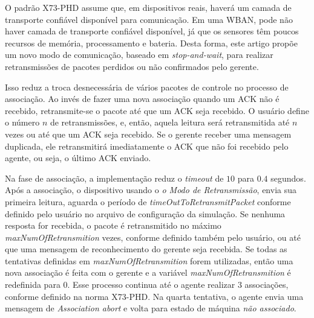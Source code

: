 O padrão X73-PHD assume que, em dispositivos reais, haverá um camada de transporte confiável disponível para comunicação. Em uma WBAN, pode não haver camada de transporte confiável disponível, já que os sensores têm poucos recursos de memória, processamento e bateria. Desta forma, este artigo propõe um novo modo de comunicação, baseado em \textit{stop-and-wait}, para realizar retransmissões de pacotes perdidos ou não confirmados pelo gerente.

Isso reduz a troca desnecessária de vários pacotes de controle no processo de associação. Ao invés de fazer uma nova associação quando um ACK não é recebido, retransmite-se o pacote até que um ACK seja recebido. O usuário define o número $n$ de retransmissões, e, então, aquela leitura será retransmitida até $n$ vezes ou até que um ACK seja recebido. Se o gerente receber uma mensagem duplicada, ele retransmitirá imediatamente o ACK que não foi recebido pelo agente, ou seja, o último ACK enviado.

Na fase de associação, a implementação reduz o \textit{timeout} de $10$ para $0.4$ segundos. Após a associação, o dispositivo usando o \textit{o Modo de Retransmissão}, envia sua primeira leitura, aguarda o período de \textit{timeOutToRetransmitPacket} conforme definido pelo usuário no arquivo de configuração da simulação. Se nenhuma resposta for recebida, o pacote é retransmitido no máximo \textit{maxNumOfRetransmition} vezes, conforme definido também pelo usuário, ou até que uma mensagem de reconhecimento do gerente seja recebida. Se todas as tentativas definidas em \textit{maxNumOfRetransmition} forem utilizadas, então uma nova associação é feita com o gerente e a variável \textit{maxNumOfRetransmition} é redefinida para $0$. Esse processo continua até o agente realizar $3$ associações, conforme definido na norma X73-PHD. Na quarta tentativa, o agente envia uma mensagem de \textit{Association abort} e volta para estado de máquina \textit{não associado}. 

